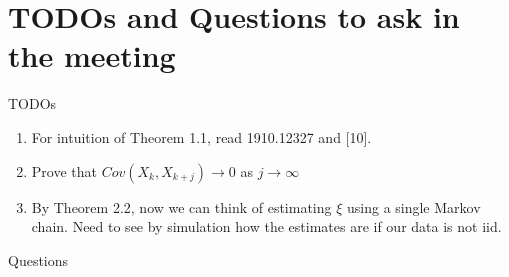\chapter{TODOs and Questions to ask in the meeting}

TODOs
\begin{enumerate}
    \item For intuition of Theorem 1.1, read 1910.12327 and [10]. 
    \item Prove that $Cov(X_k, X_{k+j}) \rightarrow 0$ as $j \rightarrow \infty$
    \item By Theorem 2.2, now we can think of estimating $\xi$ using a single Markov chain. Need to see by simulation how the estimates are if our data is not iid.
\end{enumerate}

Questions
\begin{enumerate}
\end{enumerate}
